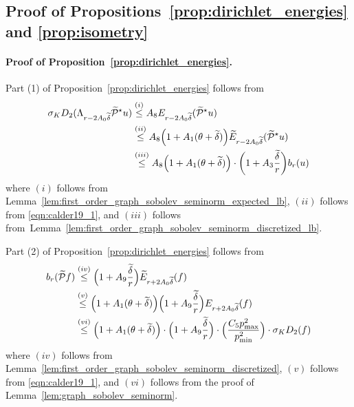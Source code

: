 \subsection{Proof of Propositions~\ref{prop:dirichlet_energies} and \ref{prop:isometry}}
\label{subsec:proof_of_prop_dirichlet_energies_and_isometry}

\paragraph{Proof of Proposition~\ref{prop:dirichlet_energies}.}
Part (1) of Proposition~\ref{prop:dirichlet_energies} follows from
\begin{align*}
\sigma_K D_2(\Lambda_{r - 2A_0\widetilde{\delta}} \widetilde{\mathcal{P}}^{\star}u) & \overset{(i)}{\leq} A_8 E_{r - 2A_0\widetilde{\delta}}(\widetilde{\mathcal{P}}^{\star}u) \\
& \overset{(ii)}{\leq} A_8 \Bigl(1 + A_1(\theta + \widetilde{\delta})\Bigr) \widetilde{E}_{r - 2A_0\widetilde{\delta}}(\widetilde{\mathcal{P}}^{\star}u) \\
& \overset{(iii)}{\leq} A_8 \Bigl(1 + A_1(\theta + \widetilde{\delta})\Bigr) \cdot \biggl(1 + A_3\frac{\widetilde{\delta}}{r}\biggr) b_r(u)
\end{align*}
where $(i)$ follows from Lemma~\ref{lem:first_order_graph_sobolev_seminorm_expected_lb}, $(ii)$ follows from \eqref{eqn:calder19_1}, and $(iii)$ follows from~Lemma~\ref{lem:first_order_graph_sobolev_seminorm_discretized_lb}.

Part (2) of Proposition~\ref{prop:dirichlet_energies} follows from
\begin{align*}
b_r(\widetilde{\mathcal{P}}f) & \overset{(iv)}{\leq} \Bigl(1 + A_9\frac{\widetilde{\delta}}{r}\Bigr)\widetilde{E}_{r + 2A_0\widetilde{\delta}}(f)\\
& \overset{(v)}{\leq} \Bigl(1 + A_1(\theta + \widetilde{\delta})\Bigr) \Bigl(1 + A_9\frac{\widetilde{\delta}}{r}\Bigr){E}_{r + 2A_0\widetilde{\delta}}(f) \\
& \overset{(vi)}{\leq} \Bigl(1 + A_1(\theta + \widetilde{\delta})\Bigr) \cdot \Bigl(1 + A_9\frac{\widetilde{\delta}}{r}\Bigr) \cdot \Bigl(\frac{C_5 p_{\max}^2}{p_{\min}^2}\Bigr) \cdot \sigma_{K} D_2(f)
\end{align*}
where $(iv)$ follows from Lemma~\ref{lem:first_order_graph_sobolev_seminorm_discretized}, $(v)$ follows from \eqref{eqn:calder19_1}, and $(vi)$ follows from the proof of Lemma~\ref{lem:graph_sobolev_seminorm}.

